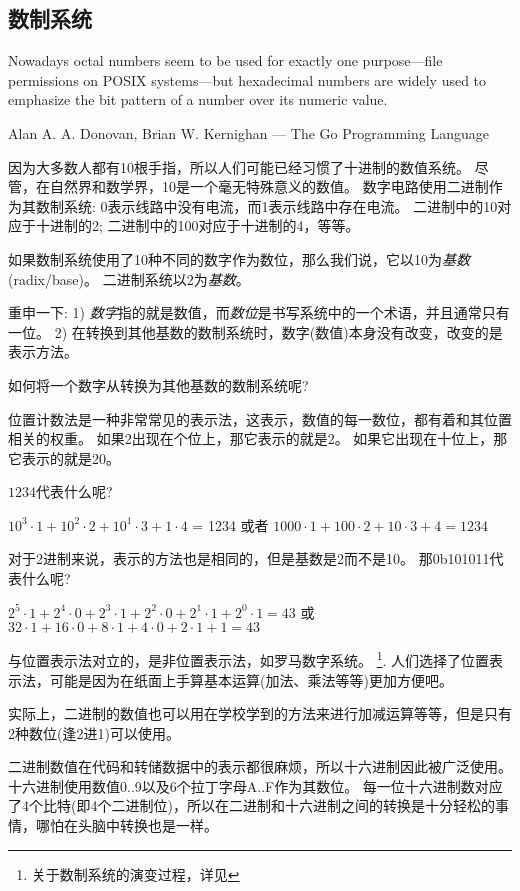 \subsection{数制系统}

\epigraph{Nowadays octal numbers seem to be
used for exactly one purpose---file permissions on POSIX systems---but hexadecimal numbers
are widely used to emphasize the bit pattern of a number over its numeric value.}
{Alan A. A. Donovan, Brian W. Kernighan ---  The Go Programming Language}

因为大多数人都有10根手指，所以人们可能已经习惯了十进制的数值系统。
尽管，在自然界和数学界，10是一个毫无特殊意义的数值。
数字电路使用二进制作为其数制系统: 0表示线路中没有电流，而1表示线路中存在电流。
二进制中的10对应于十进制的2; 二进制中的100对应于十进制的4，等等。

如果数制系统使用了10种不同的数字作为数位，那么我们说，它以10为\emph{基数}(radix/base)。
二进制系统以2为\emph{基数}。

重申一下:
1) \emph{数字}指的就是数值，而\emph{数位}是书写系统中的一个术语，并且通常只有一位。
2) 在转换到其他基数的数制系统时，数字(数值)本身没有改变，改变的是表示方法。

如何将一个数字从转换为其他基数的数制系统呢?

位置计数法是一种非常常见的表示法，这表示，数值的每一数位，都有着和其位置相关的权重。
如果2出现在个位上，那它表示的就是2。
如果它出现在十位上，那它表示的就是20。

$1234$代表什么呢?

$10^3 \cdot 1 + 10^2 \cdot 2 + 10^1 \cdot 3 + 1 \cdot 4$ = 1234 或者
$1000 \cdot 1 + 100 \cdot 2 + 10 \cdot 3 + 4 = 1234$

对于2进制来说，表示的方法也是相同的，但是基数是2而不是10。
那0b101011代表什么呢?

$2^5 \cdot 1 + 2^4 \cdot 0 + 2^3 \cdot 1 + 2^2 \cdot 0 + 2^1 \cdot 1 + 2^0 \cdot 1 = 43$ 或
$32 \cdot 1 + 16 \cdot 0 + 8 \cdot 1 + 4 \cdot 0 + 2 \cdot 1 + 1 = 43$

与位置表示法对立的，是非位置表示法，如罗马数字系统。
\footnote{关于数制系统的演变过程，详见}.
人们选择了位置表示法，可能是因为在纸面上手算基本运算(加法、乘法等等)更加方便吧。

实际上，二进制的数值也可以用在学校学到的方法来进行加减运算等等，但是只有2种数位(逢2进1)可以使用。

二进制数值在代码和转储数据中的表示都很麻烦，所以十六进制因此被广泛使用。
十六进制使用数值0..9以及6个拉丁字母A..F作为其数位。
每一位十六进制数对应了4个比特(即4个二进制位)，所以在二进制和十六进制之间的转换是十分轻松的事情，哪怕在头脑中转换也是一样。

